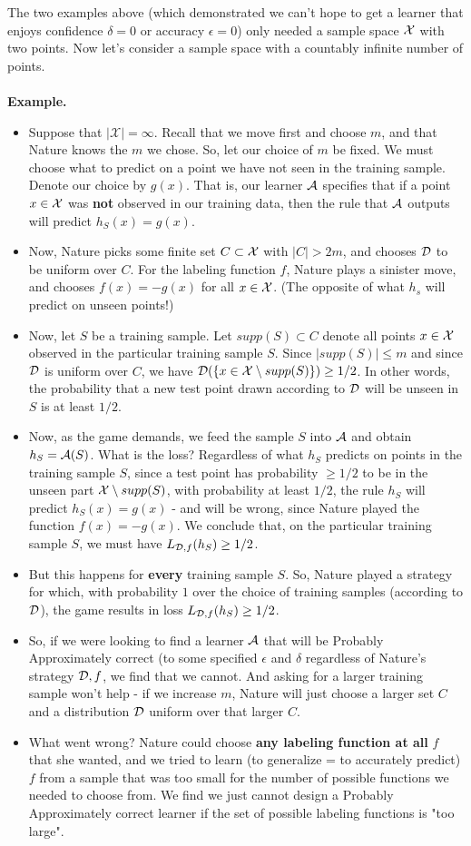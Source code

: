 The two examples above (which demonstrated we can't hope to get a learner that enjoys confidence $\delta=0$ or accuracy $\epsilon=0$) only needed a sample space $\mathcal{X}$ with two points. 
Now let's consider a sample space with a countably infinite number of points.  
\\~\\
{\bf Example.}
\begin{itemize}
\item Suppose that $|\mathcal{X}| = \infty$. Recall that we move first and choose $m$, and that Nature knows the $m$ we chose. So, let our choice of $m$ be fixed. We must choose what to predict on a point we have not seen in the training sample. Denote our choice by 
$g(x)$. That is, our learner $\mathcal{A}$ specifies that if a point $x\in\mathcal{X}$ was {\bf not} observed in our training data, then the rule that $\mathcal{A}$ outputs will predict $h_S(x)=g(x)$. 
\item Now, Nature picks some finite set $C \subset \mathcal{X}$ with $ |C| > 2m$, and chooses $\mathcal{D}$ to be uniform 
over $C$. For the labeling function $f$, Nature plays a sinister move, and chooses $f(x)=-g(x)$ for all $x\in\mathcal{X}$. (The opposite of what $h_s$ will predict on unseen points!)
\item Now, let $S$ be a training sample. Let $supp(S)\subset C$ denote all points $x\in\mathcal{X}$ observed in the particular training sample $S$.
Since $|supp(S)|\leq m$ and since $\mathcal{D}$ is uniform over $C$, we have $\mathcal{D}(\{x\in \mathcal{X}\setminus supp(S)\})\geq 1/2$.
In other words, the probability that a new test point drawn according to $\mathcal{D}$ will be unseen in $S$ is at least $1/2$.
\item Now, as the game demands, we feed the sample $S$ into $\mathcal{A}$ and obtain $h_S=\mathcal{A}(S)$. What is the loss? Regardless of what $h_S$ predicts on points in the training sample $S$, since a test point has probability $\geq 1/2$ to be in the unseen part $\mathcal{X}\setminus supp(S)$, with probability at least $1/2$, the rule $h_S$ will predict $h_S(x)=g(x)$ - and will be wrong, since Nature played the function $f(x)=-g(x)$. We conclude that, on the particular training sample $S$, we must have $L_{\mathcal{D},f}(h_S)\geq 1/2$.
\item But this happens for {\bf every} training sample $S$. So, Nature played a strategy for which, with probability $1$ over the choice of training samples (according to $\mathcal{D}$), the game results in loss  $L_{\mathcal{D},f}(h_S)\geq 1/2$.
\item So, if we were looking to find a learner $\mathcal{A}$ that will be Probably
  Approximately correct (to some specified $\epsilon$ and $\delta$ regardless of Nature's strategy $\mathcal{D},f$, we find that we cannot. And asking for a larger training sample won't help - if we increase $m$, Nature will just choose a larger set $C$ and a distribution $\mathcal{D}$ uniform over that larger $C$.
\item What went wrong? Nature could choose {\bf any labeling function at all} $f$ that she wanted, and we tried to learn (to generalize = to accurately predict) $f$ from a sample that was too small for the number of possible functions we needed to choose from. We find we just cannot design a Probably Approximately correct learner if the set of possible labeling functions is "too large". 
\end{itemize} 


